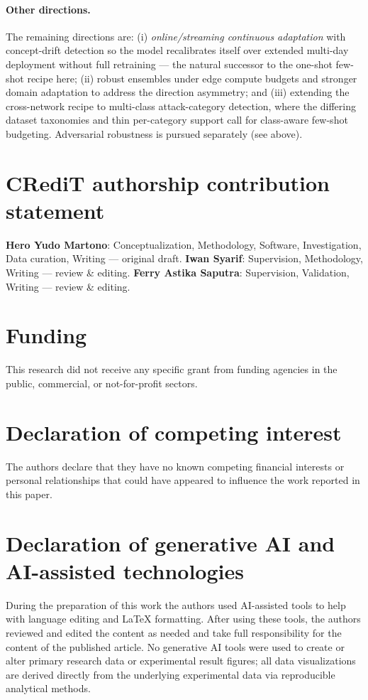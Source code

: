 \documentclass[preprint,12pt,authoryear]{elsarticle}
\begin{document}
\paragraph{Other directions.} The remaining directions are:
(i) \emph{online/streaming continuous adaptation} with concept-drift detection so
the model recalibrates itself over extended multi-day deployment without full
retraining --- the natural successor to the one-shot few-shot recipe here;
(ii) robust ensembles under edge compute budgets and stronger domain adaptation to
address the direction asymmetry; and (iii) extending the cross-network recipe to
multi-class attack-category detection, where the differing dataset taxonomies and
thin per-category support call for class-aware few-shot budgeting. Adversarial
robustness is pursued separately (see above).

\FloatBarrier

\section*{CRediT authorship contribution statement}
\textbf{Hero Yudo Martono}: Conceptualization, Methodology, Software,
Investigation, Data curation, Writing --- original draft. \textbf{Iwan Syarif}:
Supervision, Methodology, Writing --- review \& editing. \textbf{Ferry Astika
Saputra}: Supervision, Validation, Writing --- review \& editing.

\section*{Funding}
This research did not receive any specific grant from funding agencies in the
public, commercial, or not-for-profit sectors.

\section*{Declaration of competing interest}
The authors declare that they have no known competing financial interests or
personal relationships that could have appeared to influence the work reported in
this paper.

\section*{Declaration of generative AI and AI-assisted technologies}
During the preparation of this work the authors used AI-assisted tools to help
with language editing and LaTeX formatting. After using these tools, the authors
reviewed and edited the content as needed and take full responsibility for the
content of the published article. No generative AI tools were used to create or
alter primary research data or experimental result figures; all data
visualizations are derived directly from the underlying experimental data via
reproducible analytical methods.
\end{document}
